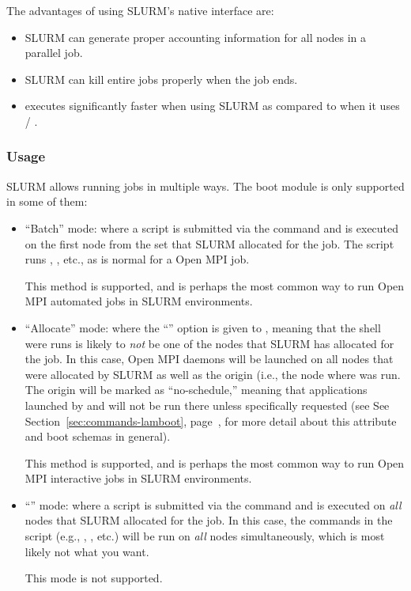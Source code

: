 The advantages of using SLURM's native interface are:

\begin{itemize}
\item SLURM can generate proper accounting information for all nodes in
  a parallel job.

\item SLURM can kill entire jobs properly when the job ends.  
  
\item {} executes significantly faster when using SLURM as
  compared to when it uses  / .
\end{itemize}


\subsubsection{Usage}

SLURM allows running jobs in multiple ways.  The  boot
module is only supported in some of them:

\begin{itemize}
\item ``Batch'' mode: where a script is submitted via the 
  command and is executed on the first node from the set that SLURM
  allocated for the job.  The script runs ,
  , etc., as is normal for a Open MPI job.
  
  This method is supported, and is perhaps the most common way to run
  Open MPI automated jobs in SLURM environments.
  
\item ``Allocate'' mode: where the ``'' option is given to
  , meaning that the shell were  runs is
  likely to {\em not} be one of the nodes that SLURM has allocated for
  the job.  In this case, Open MPI daemons will be launched on all nodes
  that were allocated by SLURM as well as the origin (i.e., the node
  where  was run.  The origin will be marked as
  ``no-schedule,'' meaning that applications launched by 
  and  will not be run there unless specifically
  requested (see See Section~\ref{sec:commands-lamboot},
  page~\pageref{sec:commands-lamboot}, for more detail about this
  attribute and boot schemas in general).

  This method is supported, and is perhaps the most common way to run
  Open MPI interactive jobs in SLURM environments.
  
\item ``'' mode: where a script is submitted via the
   command and is executed on {\em all} nodes that SLURM
  allocated for the job.  In this case, the commands in the script
  (e.g., , , etc.) will be run on {\em all}
  nodes simultaneously, which is most likely not what you want.

  This mode is not supported.
\end{itemize}

